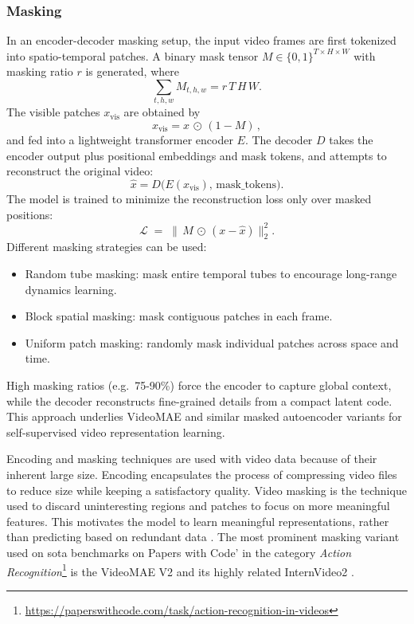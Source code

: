 \subsubsection{Masking}

In an encoder-decoder masking setup, the input video frames are first tokenized into spatio-temporal patches. A binary mask tensor \(M\in\{0,1\}^{T\times H\times W}\) with masking ratio \(r\) is generated, where
\[
\sum_{t,h,w} M_{t,h,w} = r\,T\,H\,W.
\]
The visible patches \(x_\text{vis}\) are obtained by
\[
x_\text{vis} = x \,\odot\,(1 - M)\,,
\]
and fed into a lightweight transformer encoder \(E\). The decoder \(D\) takes the encoder output plus positional embeddings and mask tokens, and attempts to reconstruct the original video:
\[
\hat{x} = D\bigl(E(x_\text{vis}),\,\text{mask\_tokens}\bigr).
\]
The model is trained to minimize the reconstruction loss only over masked positions:
\[
\mathcal{L} \;=\; \bigl\lVert\,M \,\odot\,(x - \hat{x})\bigr\rVert_2^2.
\]
Different masking strategies can be used:
\begin{itemize}
    \item Random tube masking: mask entire temporal tubes to encourage long-range dynamics learning.
    \item Block spatial masking: mask contiguous patches in each frame.
    \item Uniform patch masking: randomly mask individual patches across space and time.
\end{itemize}
High masking ratios (e.g.\ 75-90\%) force the encoder to capture global context, while the decoder reconstructs fine-grained details from a compact latent code. This approach underlies VideoMAE and similar masked autoencoder variants for self-supervised video representation learning.


Encoding and masking techniques are used with video data because of their inherent large size. Encoding encapsulates the process of compressing video files to reduce size while keeping a satisfactory quality. Video masking is the technique used to discard uninteresting regions and patches to focus on more meaningful features. This motivates the model to learn meaningful representations, rather than predicting based on redundant data \cite{tong_videomae_2022}. The most prominent masking variant used on \acrshort{sota} benchmarks on Papers with Code' in the category \textit{Action Recognition}\footnote{\url{https://paperswithcode.com/task/action-recognition-in-videos}} is the VideoMAE V2 \cite{wang_videomae_2023} and its highly related InternVideo2 \cite{wang_internvideo2_2024}. 


